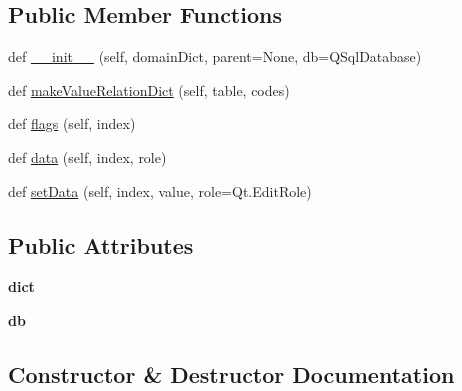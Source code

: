 \subsection*{Public Member Functions}
\begin{DoxyCompactItemize}
\item 
def \mbox{\hyperlink{class_dsg_tools_1_1_complex_tools_1_1manage_complex_1_1_custom_table_model_ab86d31819c0ae06af3f4e2e5fc373621}{\+\_\+\+\_\+init\+\_\+\+\_\+}} (self, domain\+Dict, parent=None, db=Q\+Sql\+Database)
\item 
def \mbox{\hyperlink{class_dsg_tools_1_1_complex_tools_1_1manage_complex_1_1_custom_table_model_a243d268c99b99a6d0b36b206cdd36879}{make\+Value\+Relation\+Dict}} (self, table, codes)
\item 
def \mbox{\hyperlink{class_dsg_tools_1_1_complex_tools_1_1manage_complex_1_1_custom_table_model_ad646fd451693da6b140b6890e800e181}{flags}} (self, index)
\item 
def \mbox{\hyperlink{class_dsg_tools_1_1_complex_tools_1_1manage_complex_1_1_custom_table_model_a4bc6d5b14b974fedeca4716f5b45cd96}{data}} (self, index, role)
\item 
def \mbox{\hyperlink{class_dsg_tools_1_1_complex_tools_1_1manage_complex_1_1_custom_table_model_a38742e74ac764ee395cac99b80ddd113}{set\+Data}} (self, index, value, role=Qt.\+Edit\+Role)
\end{DoxyCompactItemize}
\subsection*{Public Attributes}
\begin{DoxyCompactItemize}
\item 
\mbox{\label{class_dsg_tools_1_1_complex_tools_1_1manage_complex_1_1_custom_table_model_a4ffbcb41fa5577db8eab5504e7dcdb16}} 
{\bfseries dict}
\item 
\mbox{\label{class_dsg_tools_1_1_complex_tools_1_1manage_complex_1_1_custom_table_model_ae1ca4acda85f22bbcbc88a43c122ed84}} 
{\bfseries db}
\end{DoxyCompactItemize}


\subsection{Constructor \& Destructor Documentation}
\mbox{\label{class_dsg_tools_1_1_complex_tools_1_1manage_complex_1_1_custom_table_model_ab86d31819c0ae06af3f4e2e5fc373621}} 
